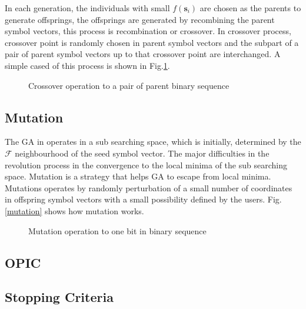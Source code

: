 In each generation, the individuals with small $f(\mathbf{s}_{i})$ are chosen as the parents to generate offsprings, the offsprings are generated by recombining the parent symbol vectors, this process is recombination or crossover. In crossover process, crossover point is randomly chosen in parent symbol vectors and the subpart of a pair of parent symbol vectors up to that crossover point are interchanged. A simple cased of this process is shown in Fig.\ref{crossover}.
\begin{figure}
\centering
\def\svgwidth{\columnwidth}

\caption{Crossover operation to a pair of parent binary sequence}
\label{crossover}
\end{figure}
\subsection{Mutation}
The GA in operates in a sub searching space, which is initially, determined by the $\mathcal{F}$ neighbourhood of the seed symbol vector. The major difficulties in the revolution process in the convergence to the local minima of the sub searching space. Mutation is a strategy that helps GA to escape from local minima. Mutations operates by randomly perturbation of a small number of coordinates in offspring symbol vectors with a small possibility defined by the users. Fig.\ref{mutation} shows how mutation works. 
\begin{figure}
\centering
\def\svgwidth{\columnwidth}

\caption{Mutation operation to one bit in binary sequence}
\label{mutaion}
\end{figure}
\subsection{OPIC} 
\subsection{Stopping Criteria}
 